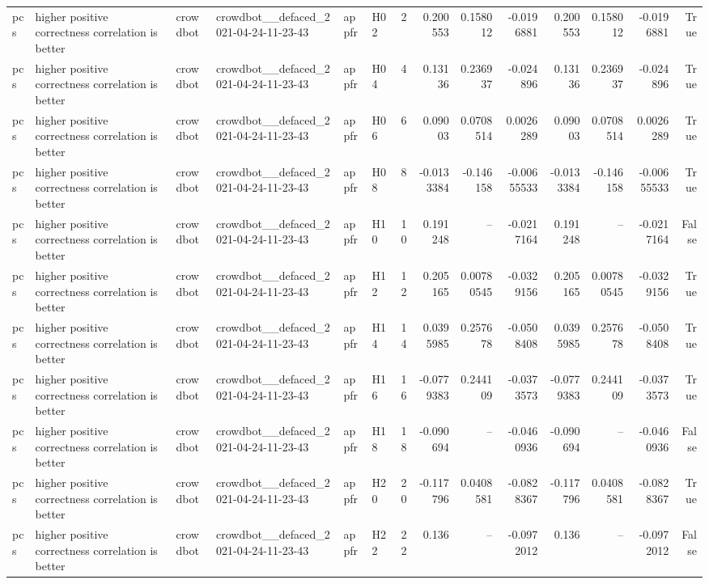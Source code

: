 \begin{longtable}{llllllrrrrrrrr}
pcs & higher positive correctness correlation is better & crowdbot & crowdbot\_\_defaced\_2021-04-24-11-23-43 & appfr & H02 & 2 & 0.200553 & 0.158012 & -0.0196881 & 0.200553 & 0.158012 & -0.0196881 & True \\
pcs & higher positive correctness correlation is better & crowdbot & crowdbot\_\_defaced\_2021-04-24-11-23-43 & appfr & H04 & 4 & 0.13136 & 0.236937 & -0.024896 & 0.13136 & 0.236937 & -0.024896 & True \\
pcs & higher positive correctness correlation is better & crowdbot & crowdbot\_\_defaced\_2021-04-24-11-23-43 & appfr & H06 & 6 & 0.09003 & 0.0708514 & 0.0026289 & 0.09003 & 0.0708514 & 0.0026289 & True \\
pcs & higher positive correctness correlation is better & crowdbot & crowdbot\_\_defaced\_2021-04-24-11-23-43 & appfr & H08 & 8 & -0.0133384 & -0.146158 & -0.00655533 & -0.0133384 & -0.146158 & -0.00655533 & True \\
pcs & higher positive correctness correlation is better & crowdbot & crowdbot\_\_defaced\_2021-04-24-11-23-43 & appfr & H10 & 10 & 0.191248 & -- & -0.0217164 & 0.191248 & -- & -0.0217164 & False \\
pcs & higher positive correctness correlation is better & crowdbot & crowdbot\_\_defaced\_2021-04-24-11-23-43 & appfr & H12 & 12 & 0.205165 & 0.00780545 & -0.0329156 & 0.205165 & 0.00780545 & -0.0329156 & True \\
pcs & higher positive correctness correlation is better & crowdbot & crowdbot\_\_defaced\_2021-04-24-11-23-43 & appfr & H14 & 14 & 0.0395985 & 0.257678 & -0.0508408 & 0.0395985 & 0.257678 & -0.0508408 & True \\
pcs & higher positive correctness correlation is better & crowdbot & crowdbot\_\_defaced\_2021-04-24-11-23-43 & appfr & H16 & 16 & -0.0779383 & 0.244109 & -0.0373573 & -0.0779383 & 0.244109 & -0.0373573 & True \\
pcs & higher positive correctness correlation is better & crowdbot & crowdbot\_\_defaced\_2021-04-24-11-23-43 & appfr & H18 & 18 & -0.090694 & -- & -0.0460936 & -0.090694 & -- & -0.0460936 & False \\
pcs & higher positive correctness correlation is better & crowdbot & crowdbot\_\_defaced\_2021-04-24-11-23-43 & appfr & H20 & 20 & -0.117796 & 0.0408581 & -0.0828367 & -0.117796 & 0.0408581 & -0.0828367 & True \\
pcs & higher positive correctness correlation is better & crowdbot & crowdbot\_\_defaced\_2021-04-24-11-23-43 & appfr & H22 & 22 & 0.136 & -- & -0.0972012 & 0.136 & -- & -0.0972012 & False \\

\end{longtable}
